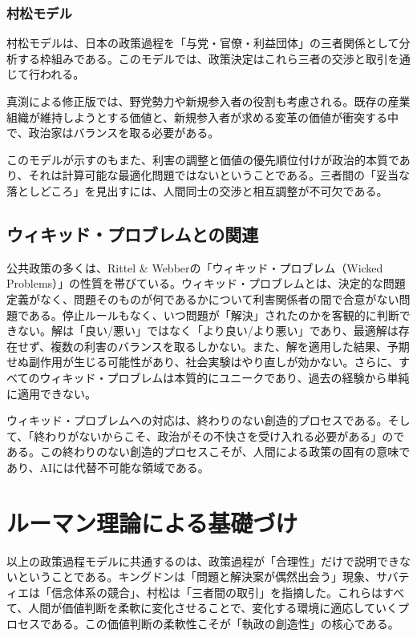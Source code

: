 \documentclass{keikaku}
\begin{document}
\subsubsection{村松モデル}

村松モデルは、日本の政策過程を「与党・官僚・利益団体」の三者関係として分析する枠組みである\cite{muramatsu1981}。このモデルでは、政策決定はこれら三者の交渉と取引を通じて行われる。

真渕による修正版では、野党勢力や新規参入者の役割も考慮される。既存の産業組織が維持しようとする価値と、新規参入者が求める変革の価値が衝突する中で、政治家はバランスを取る必要がある。

このモデルが示すのもまた、利害の調整と価値の優先順位付けが政治的本質であり、それは計算可能な最適化問題ではないということである。三者間の「妥当な落としどころ」を見出すには、人間同士の交渉と相互調整が不可欠である。

\subsection{ウィキッド・プロブレムとの関連}

公共政策の多くは、Rittel \& Webberの「ウィキッド・プロブレム（Wicked Problems）」の性質を帯びている\cite{rittel1973}\cite{sugitani2021}。ウィキッド・プロブレムとは、決定的な問題定義がなく、問題そのものが何であるかについて利害関係者の間で合意がない問題である。停止ルールもなく、いつ問題が「解決」されたのかを客観的に判断できない。解は「良い/悪い」ではなく「より良い/より悪い」であり、最適解は存在せず、複数の利害のバランスを取るしかない。また、解を適用した結果、予期せぬ副作用が生じる可能性があり、社会実験はやり直しが効かない。さらに、すべてのウィキッド・プロブレムは本質的にユニークであり、過去の経験から単純に適用できない。

ウィキッド・プロブレムへの対応は、終わりのない創造的プロセスである。そして、「終わりがないからこそ、政治がその不快さを受け入れる必要がある」のである。この終わりのない創造的プロセスこそが、人間による政策の固有の意味であり、AIには代替不可能な領域である。

\section{ルーマン理論による基礎づけ}

以上の政策過程モデルに共通するのは、政策過程が「合理性」だけで説明できないということである。キングドンは「問題と解決案が偶然出会う」現象、サバティエは「信念体系の競合」、村松は「三者間の取引」を指摘した。これらはすべて、人間が価値判断を柔軟に変化させることで、変化する環境に適応していくプロセスである。この価値判断の柔軟性こそが「執政の創造性」の核心である。
\end{document}
